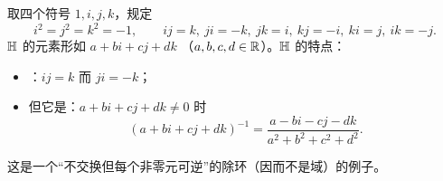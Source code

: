 \begin{example}
取四个符号 $1, i, j, k$，规定
\[
  i^2 = j^2 = k^2 = -1, \qquad
  ij = k,\ ji = -k,\ jk = i,\ kj = -i,\ ki = j,\ ik = -j.
\]
 $\mathbb{H}$ 的元素形如 $a + bi + cj + dk$
（$a,b,c,d\in\mathbb{R}$）。$\mathbb{H}$ 的特点：
\begin{itemize}[leftmargin=1.3em,itemsep=2pt]
  \item {}：$ij = k$ 而 $ji = -k$；
  \item 但它是：$a+bi+cj+dk\ne 0$ 时
        \[
          (a+bi+cj+dk)^{-1}
          = \frac{a - bi - cj - dk}{a^2+b^2+c^2+d^2}.
        \]
\end{itemize}
这是一个“不交换但每个非零元可逆”的除环（因而不是域）的例子。
\end{example}
